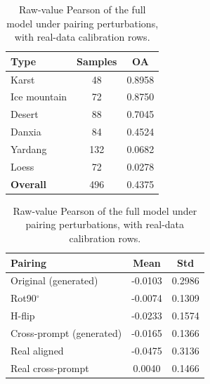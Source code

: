 \documentclass[review]{vgtc}                 %
\begin{document}
\begin{table}[h]
    \small
    \centering
    
    \begin{minipage}{0.48\columnwidth}
        \centering
        \caption{Classification accuracy across different terrain types.}
        \label{tab:accuracy}
        \begin{tabular}{lcc}
            \toprule
            \textbf{Type} & \textbf{Samples} & \textbf{OA} \\
            \midrule
            Karst        & 48  & 0.8958 \\
            Ice mountain & 72  & 0.8750 \\
            Desert       & 88  & 0.7045 \\
            Danxia       & 84  & 0.4524 \\
            Yardang      & 132 & 0.0682 \\
            Loess        & 72  & 0.0278 \\
            \midrule
            \textbf{Overall} & 496 & 0.4375 \\
            \bottomrule
        \end{tabular}
    \end{minipage}\hfill %
    \begin{minipage}{0.48\columnwidth}
        \centering
        \caption{Raw-value Pearson of the full model under pairing perturbations, with real-data calibration rows.}
        \label{tab:pairing}
        \begin{tabular}{lcc}
            \toprule
            \textbf{Pairing} & \textbf{Mean} & \textbf{Std} \\
            \midrule
            Original (generated)      & -0.0103 & 0.2986 \\
            Rot90$^\circ$ & -0.0074 & 0.1309 \\
            H-flip        & -0.0233 & 0.1574 \\
            Cross-prompt (generated)  & -0.0165 & 0.1366 \\
            \midrule
            Real aligned  & -0.0475 & 0.3136 \\
            Real cross-prompt & 0.0040 & 0.1466 \\
            \bottomrule
        \end{tabular}
    \end{minipage}
    
\end{table}
\end{document}
